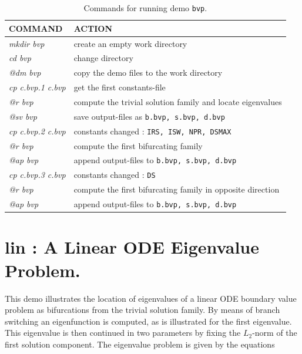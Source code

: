 \documentclass[12pt]{report}
\begin{document}
\begin{table}[htbp]
\begin{center}
\begin{tabular}{| l | l |}
\hline
  COMMAND  & ACTION \\
\hline
  {\it mkdir bvp} & create an empty work directory \\ 
  {\it cd bvp} & change directory \\
  {\it @dm bvp} & copy the demo files to the work directory \\
\hline
  {\it cp c.bvp.1 c.bvp} & get the first constants-file \\ 
  {\it @r bvp} &  compute the trivial solution family and locate eigenvalues \\ 
  {\it @sv bvp} & save output-files as {\tt b.bvp, s.bvp, d.bvp} \\ 
\hline
  {\it cp c.bvp.2 c.bvp} & constants changed : {\tt IRS, ISW, NPR, DSMAX} \\ 
  {\it @r bvp} &  compute the first bifurcating family \\ 
  {\it @ap bvp} & append output-files to {\tt b.bvp, s.bvp, d.bvp} \\ 
\hline
  {\it cp c.bvp.3 c.bvp} & constants changed : {\tt DS} \\ 
  {\it @r bvp} &  compute the first bifurcating family in opposite direction \\ 
  {\it @ap bvp} & append output-files to {\tt b.bvp, s.bvp, d.bvp} \\ 
\hline
\end{tabular}
\caption{Commands for running demo {\tt bvp}.}
\label{tbl:demo_bvp}
\end{center}
\end{table}

\newpage
\section{ lin : A Linear ODE Eigenvalue Problem.} \label{sec:Demos_lin}
This demo illustrates the location of eigenvalues of a linear ODE
boundary value problem as bifurcations from the trivial solution family.
By means of branch switching an eigenfunction is computed,
as is illustrated for the first eigenvalue. 
This eigenvalue is then continued in two parameters
by fixing the $L_2$-norm of the first solution component.
The eigenvalue problem is given by the equations
\end{document}
